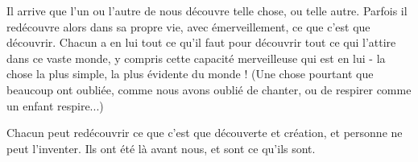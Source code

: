 Il arrive que l'un ou l'autre de nous découvre telle chose, ou telle autre. Parfois il redécouvre alors dans sa propre vie, avec émerveillement, ce que c'est que découvrir. Chacun a en lui tout ce qu'il faut pour découvrir tout ce qui l'attire dans ce vaste monde, y compris cette capacité merveilleuse qui est en lui - la chose la plus simple, la plus évidente du monde ! (Une chose pourtant que beaucoup ont oubliée, comme nous avons oublié de chanter, ou de respirer comme un enfant respire...)

Chacun peut redécouvrir ce que c'est que découverte et création, et personne ne peut l'inventer. Ils ont été là avant nous, et sont ce qu'ils sont.

